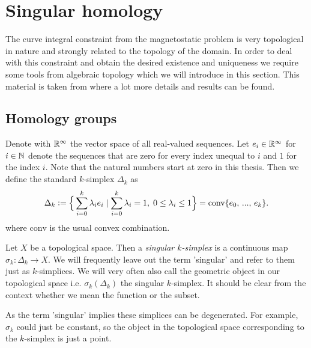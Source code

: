 \documentclass[../main.tex]{subfiles}
\begin{document}


\section{Singular homology}\label{sec:singular_homology}

The curve integral constraint from the magnetostatic problem is very topological %
in nature and strongly related to the topology of the domain. 
In order to deal with this constraint and obtain the desired existence and
uniqueness we require some tools from algebraic topology which we will introduce 
in this section. 
This material is taken from
\cite{topology_and_geometry} where a lot more details and results can be found.

\subsection{Homology groups}

Denote with $\mathbb{R}^\infty$ the vector space of all real-valued sequences. Let 
$e_i \in \mathbb{R}^\infty$ for $i \in \mathbb{N}$ denote the sequences 
that are zero for every index 
unequal to $i$ and $1$ for the index $i$. Note that 
the natural numbers start at zero in this thesis. Then we define the standard $k$-simplex 
$\Delta_k$ as
\begin{align*}
    \Delta_k \vcentcolon= \Big\{ \sum\limits_{i=0}^k  \lambda_i e_i \mid 
    \sum\limits_{i=0}^k \lambda_i = 1 , \; 0\leq \lambda_i \leq 1\Big\}
    = \text{conv} \{e_0,\,...,\, e_k\}.
\end{align*}
where $\text{conv}$ is the usual convex combination. 

\begin{definition}[$k$-simplex]
    Let $X$ be a topological space. Then a \textit{singular $k$-simplex} is a continuous 
    map $\sigma_k: \Delta_k \rightarrow X$. We will frequently leave out the term 'singular'
    and refer to them just as $k$-simplices. We will very often also call 
    the geometric object in our topological space i.e. $\sigma_k(\Delta_k)$
    the singular $k$-simplex. It should be clear from the context whether we mean 
    the function or the subset.
\end{definition}

As the term 'singular' implies these simplices can be degenerated. For example, $\sigma_k$ could 
just be constant, so the object in the topological space corresponding to the 
$k$-simplex is just a point.
\end{document}
